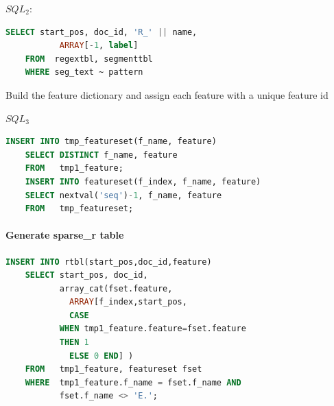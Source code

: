 \documentclass[11pt,letterpaper]{article}
\begin{document}
$SQL_2$:\\
\begin{lstlisting}[language=SQL,gobble=4]
    SELECT start_pos, doc_id, 'R_' || name, 
           ARRAY[-1, label]
    FROM  regextbl, segmenttbl
    WHERE seg_text ~ pattern
\end{lstlisting}

Build the feature dictionary and assign each feature with a unique feature id


$SQL_3$\\ 
\begin{lstlisting}[language=SQL,gobble=4]
    INSERT INTO tmp_featureset(f_name, feature) 
    SELECT DISTINCT f_name, feature
    FROM   tmp1_feature;
    INSERT INTO featureset(f_index, f_name, feature) 
    SELECT nextval('seq')-1, f_name, feature
    FROM   tmp_featureset;
\end{lstlisting}

\paragraph{Generate sparse\_r table}
\begin{lstlisting}[language=SQL,gobble=4]
    INSERT INTO rtbl(start_pos,doc_id,feature)
    SELECT start_pos, doc_id, 
           array_cat(fset.feature, 
		     ARRAY[f_index,start_pos, 
		     CASE 
           WHEN tmp1_feature.feature=fset.feature 
           THEN 1
		     ELSE 0 END] )
    FROM   tmp1_feature, featureset fset
    WHERE  tmp1_feature.f_name = fset.f_name AND 
           fset.f_name <> 'E.';
\end{lstlisting}
\end{document}
